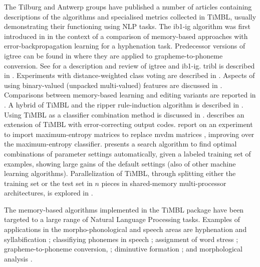 \documentclass{report}
\begin{document}
The Tilburg and Antwerp groups have published a number of articles
containing descriptions of the algorithms and specialised metrics
collected in TiMBL, usually demonstrating their functioning using NLP
tasks. The {\sc ib1-ig} algorithm was first introduced in
\cite{Daelemans+92b} in the context of a comparison of memory-based
approaches with error-back\-propagation learning for a hyphenation
task.  Predecessor versions of {\sc igtree} can be found in
\cite{Daelemans+93c,VandenBosch+93} where they are applied to
grapheme-to-phoneme conversion.  See \cite{Daelemans+97} for a
description and review of {\sc igtree} and {\sc ib1-ig}. {\sc tribl}
is described in \cite{Daelemans+97d}.  Experiments with
distance-weighted class voting are described in
\cite{Zavrel97}. Aspects of using binary-valued (unpacked
multi-valued) features are discussed in \cite{VandenBosch+00}.
Comparisons between memory-based learning and editing variants are
reported in \cite{VandenBosch99,Daelemans+99}. A hybrid of TiMBL and
the {\sc ripper} rule-induction algorithm \cite{Cohen95} is described
in \cite{VandenBosch00,VandenBosch04}. Using TiMBL as a classifier
combination method is discussed in
\cite{Halteren+01}.  describes an extension of
TiMBL with error-correcting output codes. 
report on an experiment to import maximum-entropy matrices to replace
{\sc mvdm} matrices \cite{Hendrickx+04}, improving over the
maximum-entropy classifier.  presents a search
algorithm to find optimal combinations of parameter settings
automatically, given a labeled training set of examples, showing large
gains of the default settings (also of other machine learning
algorithms). Parallelization of TiMBL, through splitting either the
training set or the test set in $n$ pieces in shared-memory
multi-processor architectures, is explored in \cite{VandenBosch+07b}.

The memory-based algorithms implemented in the TiMBL package have been
targeted to a large range of Natural Language Processing
tasks. Examples of applications in the morpho-phonological and speech
areas are hyphenation and syllabification \cite{Daelemans+92b};
classifiying phonemes in speech \cite{Kocsor+00}; assignment of word
stress \cite{Daelemans+94}; grapheme-to-phoneme conversion,
\cite{VandenBosch+93,Daelemans+96,Canisius+06}; diminutive formation
\cite{Daelemans+98a}; and morphological analysis
\cite{VandenBosch+96,VandenBosch+99,Canisius+06}.
\end{document}
